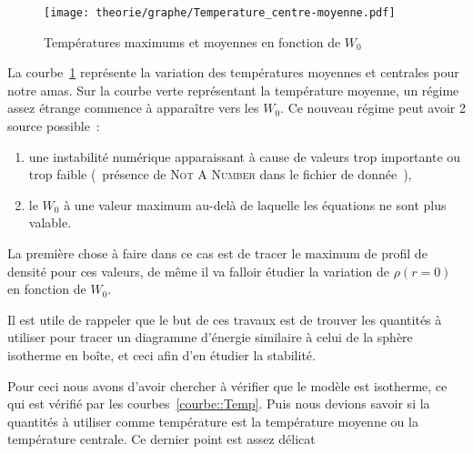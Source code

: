 \begin{figure}[h!]
	\centering \texttt{[image: theorie/graphe/Temperature\_centre-moyenne.pdf]}
	\caption{Températures maximums et moyennes en fonction de $W_0$\label{courbe::Moy}}
\end{figure}
La courbe~\ref{courbe::Moy} représente la variation des températures moyennes et centrales pour notre amas. Sur la courbe verte représentant la
température moyenne, un régime assez étrange commence à apparaître vers les $W_0$. Ce nouveau régime peut avoir 2 source possible~:
\begin{enumerate}
	\item une instabilité numérique apparaissant à cause de valeurs trop importante ou trop faible (~présence de \textsc{Not A Number} dans le
		fichier de donnée~),
	\item le $W_0$ à une valeur maximum au-delà de laquelle les équations ne sont plus valable.
\end{enumerate}
La première chose à faire dans ce cas est de tracer le maximum de profil de densité pour ces valeurs, de même il va falloir étudier la variation de
$\rho(r=0)$ en fonction de $W_0$.

Il est utile de rappeler que le but de ces travaux est de trouver les quantités à utiliser pour tracer un diagramme d'énergie similaire à celui de la
sphère isotherme en boîte, et ceci afin d'en étudier la stabilité.

Pour ceci nous avons d'avoir chercher à vérifier que le modèle est isotherme, ce qui est vérifié par les courbes~\ref{courbe::Temp}. Puis nous devions
savoir si la quantités à utiliser comme température est la température moyenne ou la température centrale. Ce dernier point est assez délicat
\FloatBarrier

